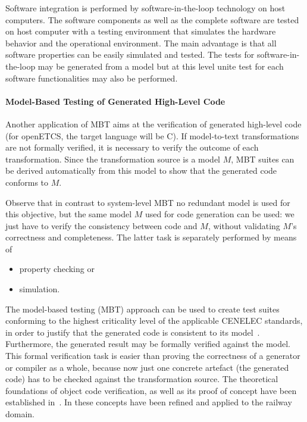 Software integration is performed by software-in-the-loop technology
on host computers. The software components as well as the complete
software are tested on host computer with a testing environment that
simulates the hardware behavior and the operational environment. The
main advantage is that all software properties can be easily simulated
and tested. The tests for software-in-the-loop may be generated from a
model but at this level unite test for each software functionalities
may also be performed.

\paragraph{Model-Based Testing of Generated High-Level Code}
Another application of MBT aims at the verification of generated
high-level code (for openETCS, the target language will be C).  If
model-to-text transformations are not formally verified, it is
necessary to verify the outcome of each transformation. Since the
transformation source is a model $M$, MBT suites can be derived
automatically from this model to show that the generated code conforms
to $M$.

Observe that in contrast to system-level MBT no redundant model is
used for this objective, but the same model $M$ used for code
generation can be used: we just have to verify the consistency between
code and $M$, without validating $M$'s correctness and
completeness. The latter task is separately performed by means of
\begin{itemize}
\item property checking or
\item simulation.
\end{itemize}
The model-based testing (MBT) approach can be used to create test
suites conforming to the highest criticality level of the applicable
CENELEC standards, in order to justify that the generated code is
consistent to its model~\cite{PeleskaVL11Nfm,pel2011a,peleska2009d}.
Furthermore, the generated result may be formally verified against the
model. This formal verification task is easier than proving the
correctness of a generator or compiler as a whole, because now just
one concrete artefact (the generated code) has to be checked against
the transformation source. The theoretical foundations of object code
verification, as well as its proof of concept have been established
in~\cite{Pnueli98}. In
\cite{RSRSChapter2012,DBLP:journals/fac/HaxthausenPK11} these concepts
have been refined and applied to the railway domain.


